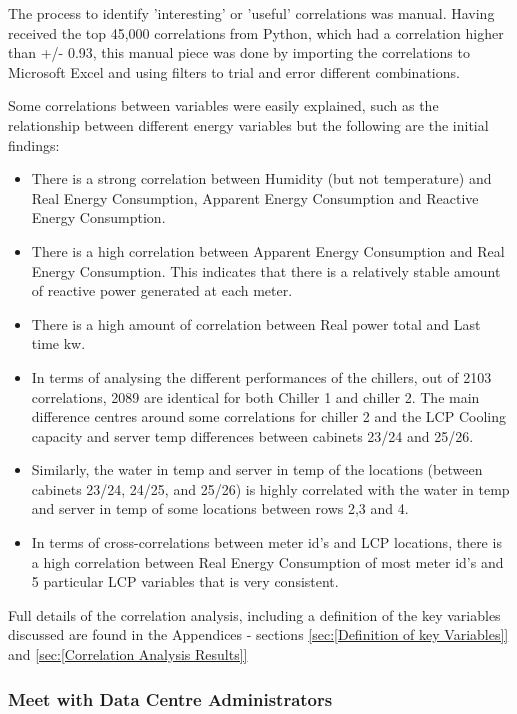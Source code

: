 \documentclass[12pt]{scrartcl}
\begin{document}
The process to identify 'interesting' or 'useful' correlations was manual. Having received the top 45,000 correlations from Python, which had a correlation higher than +/- 0.93, this manual piece was done by importing the correlations to Microsoft Excel and using filters to trial and error different combinations. 

Some correlations between variables were easily explained, such as the relationship between different energy variables but the following are the initial findings:    

\begin{itemize}
\item There is a strong correlation between Humidity (but not temperature) and Real Energy Consumption, Apparent Energy Consumption and Reactive Energy Consumption.
\item There is a high correlation between Apparent Energy Consumption and Real Energy Consumption. This indicates that there is a relatively stable amount of reactive power generated at each meter.
\item There is a high amount of correlation between Real power total and Last time kw.
\item In terms of analysing the different performances of the chillers, out of 2103 correlations, 2089 are identical for both Chiller 1 and chiller 2. The main difference centres around some correlations for chiller 2 and the LCP Cooling capacity and server temp differences between cabinets 23/24 and 25/26.
\item Similarly, the water in temp and server in temp of the locations (between cabinets 23/24, 24/25, and 25/26) is highly correlated with the water in temp and server in temp of some locations between rows 2,3 and 4.
\item In terms of cross-correlations between meter id’s and LCP locations, there is a high correlation between Real Energy Consumption of most meter id’s and 5 particular LCP variables that is very consistent.
\end{itemize}  

Full details of the correlation analysis, including a definition of the key variables discussed are found in the Appendices - sections \ref{sec:[Definition of key Variables]} and \ref{sec:[Correlation Analysis Results]}

\subsubsection{Meet with Data Centre Administrators}
\label{subsubsec:[Meet with Data Centre Administrators]}
\end{document}
